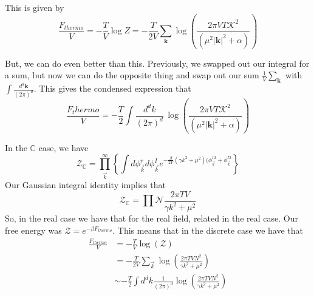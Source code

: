 \documentclass[11pt, oneside]{article}   	%
\begin{document}
This is given by
\[ 
\frac{ F_{ thermo} }{ V} =  - \frac{ T}{ V} \log Z =  - \frac{ T}{ 2V } \sum_{ \mathbf{k}} \log \left( \frac{ 2 \pi  V T \mathcal{K}^2 }{ ( \mu^2 |\mathbf{k}|^2 + \alpha ) } \right) 
\] 

But, we can do even better than this. Previously, we swapped out our integral for a sum, but now we can do the opposite thing and swap out our sum $\frac{ 1}{ V } \sum_\mathbf{k} $ with $\int \frac{ d^d \mathbf{ k} } { ( 2 \pi)^d } $. This gives the condensed expression that 
\[ 
\frac{ F_thermo}{ V} = - \frac{ T}{ 2} \int \frac{ d^d k}{ ( 2\pi )^d } \, \log \left( \frac{ 2 \pi V T \mathcal{K}^2 } { (\mu^2 |\mathbf{k}|^2 + \alpha ) } \right)  
\] 

In the $\mathbb{ C} $ case, we have 
\[
	\mathcal{ Z}_{\mathbb{ C} } = \prod_{\vec{k}}^{\infty} \left\{ \int d \phi_{\vec{k} }^r d\phi_{\vec{k} }^I e^{  - \frac{\beta}{2 V  } ( \gamma k^ 2 + \mu^ 2 )( \phi_{ \vec{k} }^ { r 2 }   + \phi_{\vec{k} }^{ I 2 }}  \right\}   
\] 
Our Gaussian integral identity implies that 
\[
	\mathcal{ Z}_{\mathbb{ C} } = \prod \mathcal{ N } \frac{ 2 \pi T V }{ \gamma k^ 2+ \mu^2 }  
\] So, in the real case we have that for the real field, 
related in the real case. 
Our free energy was $ \mathcal{ Z } = e^{  - \beta F_{ thermo  } }$. This means that 
in the discrete case 
we have that 
\begin{align*}
	\frac{F_{thermo  } }{V } &=   - \frac{T}{V} \log ( \mathcal{ Z })  \\
				 &=   - \frac{T}{ 2V } \sum_{ \vec{k} } \log \left( \frac{ 2 \pi T V N^2 }{ \gamma k^ 2 + \mu^  2} \right)  \\
				 & \sim  - \frac{T}{2 }\int d^{ d } k \frac{ 1 }{ ( 2\pi )^d } \log \left( \frac{ 2 \pi T V N^2  }{ \gamma k^2 + \mu^ 2 } \right) 
\end{align*}
\end{document}
